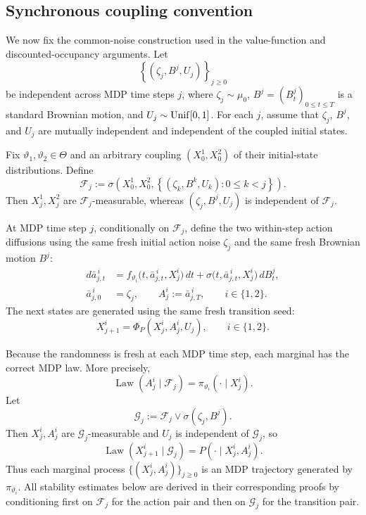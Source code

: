 \documentclass{article}
\theoremstyle{definition}
\theoremstyle{remark}
\theoremstyle{mystyle}
\newcommand{\1}{\mathbbm{1}}
\begin{document}
\subsection{Synchronous coupling convention}
\label{subsec:synchronous-mdp-coupling}

We now fix the common-noise construction used in the value-function and
discounted-occupancy arguments. Let
\[
\left\{(\zeta_j,B^j,U_j)\right\}_{j\ge 0}
\]
be independent across MDP time steps \(j\), where
\(\zeta_j\sim\mu_0\), \(B^j=(B_t^j)_{0\le t\le T}\) is a standard
Brownian motion, and \(U_j\sim{\rm Unif}[0,1]\). For each \(j\), assume
that \(\zeta_j\), \(B^j\), and \(U_j\) are mutually independent and
independent of the coupled initial states.

Fix \(\vartheta_1,\vartheta_2\in\Theta\) and an arbitrary coupling
\((X_0^1,X_0^2)\) of their initial-state distributions. Define
\[
\mathcal F_j
:=
\sigma\left(
X_0^1,X_0^2,
\left\{(\zeta_k,B^k,U_k):0\le k<j\right\}
\right).
\]
Then \(X_j^1,X_j^2\) are \(\mathcal F_j\)-measurable, whereas
\((\zeta_j,B^j,U_j)\) is independent of \(\mathcal F_j\).

At MDP time step \(j\), conditionally on \(\mathcal F_j\), define the two
within-step action diffusions using the same fresh initial action noise
\(\zeta_j\) and the same fresh Brownian motion \(B^j\):
\[
\begin{aligned}
d\bar a_{j,t}^{\,i}
&=
f_{\vartheta_i}
\bigl(t,\bar a_{j,t}^{\,i},X_j^i\bigr)\,dt
+
\sigma
\bigl(t,\bar a_{j,t}^{\,i},X_j^i\bigr)\,dB_t^j,
\\
\bar a_{j,0}^{\,i}
&=\zeta_j,
\qquad
A_j^i:=\bar a_{j,T}^{\,i},
\qquad i\in\{1,2\}.
\end{aligned}
\label{eq:mdp-action-coupling}
\]
The next states are generated using the same fresh transition seed:
\[
X_{j+1}^i
=
\Phi_P(X_j^i,A_j^i,U_j),
\qquad i\in\{1,2\}.
\label{eq:mdp-transition-coupling}
\]

Because the randomness is fresh at each MDP time step, each marginal has the
correct MDP law. More precisely,
\[
\operatorname{Law}(A_j^i\mid\mathcal F_j)
=
\pi_{\vartheta_i}(\cdot\mid X_j^i).
\]
Let
\[
\mathcal G_j
:=
\mathcal F_j\vee\sigma(\zeta_j,B^j).
\]
Then \(X_j^i,A_j^i\) are \(\mathcal G_j\)-measurable and \(U_j\) is
independent of \(\mathcal G_j\), so
\[
\operatorname{Law}(X_{j+1}^i\mid\mathcal G_j)
=
P(\cdot\mid X_j^i,A_j^i).
\]
Thus each marginal process \(\{(X_j^i,A_j^i)\}_{j\ge0}\) is an MDP
trajectory generated by \(\pi_{\vartheta_i}\).
All stability estimates below are derived in their corresponding proofs
by conditioning first on \(\mathcal F_j\) for the action pair and then
on \(\mathcal G_j\) for the transition pair.
\end{document}
